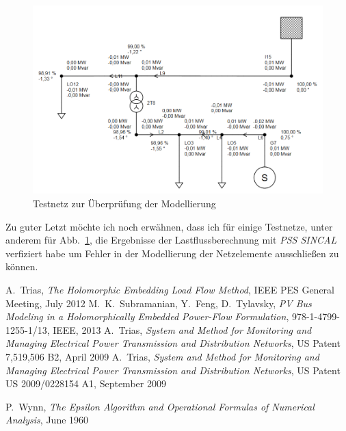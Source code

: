 \documentclass[12pt,a4paper]{article}
\newcommand{\reffig}[1]{{Abb.~\ref{#1}}}
\begin{document}
	\begin{figure}
		\centering
		\includegraphics[scale=0.55]{pictures/complete_powernet_modified}
		\caption{Testnetz zur Überprüfung der Modellierung}
		\label{fig:powernet_complete}
	\end{figure}
	
	Zu guter Letzt möchte ich noch erwähnen, dass ich für einige Testnetze, unter anderem für \reffig{fig:powernet_complete}, die Ergebnisse der Lastflussberechnung mit \emph{PSS SINCAL} verfiziert habe um Fehler in der Modellierung der Netzelemente ausschließen zu können.
	
	\begin{thebibliography}{1}
			A.~Trias, \emph{The Holomorphic Embedding Load Flow Method}, IEEE PES General Meeting, July 2012
			M.~K.~Subramanian, Y.~Feng, D.~Tylavsky, \emph{PV Bus Modeling in a Holomorphically Embedded Power-Flow Formulation}, 978-1-4799-1255-1/13, IEEE, 2013
			A.~Trias, \emph{System and Method for Monitoring and Managing Electrical Power Transmission and Distribution Networks}, US Patent 7,519,506 B2, April 2009
			A.~Trias, \emph{System and Method for Monitoring and Managing Electrical Power Transmission and Distribution Networks}, US Patent US 2009/0228154 A1, September 2009
			
			P.~Wynn, \emph{The Epsilon Algorithm and Operational Formulas of Numerical Analysis}, June 1960

	\end{thebibliography}
\end{document}
